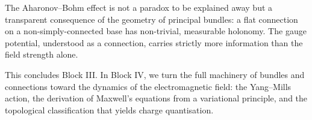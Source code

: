 The Aharonov--Bohm effect is not a paradox to be explained away but a transparent consequence of the geometry of principal bundles: a flat connection on a non-simply-connected base has non-trivial, measurable holonomy. The gauge potential, understood as a connection, carries strictly more information than the field strength alone.

This concludes Block III. In Block IV, we turn the full machinery of bundles and connections toward the dynamics of the electromagnetic field: the Yang--Mills action, the derivation of Maxwell's equations from a variational principle, and the topological classification that yields charge quantisation.
